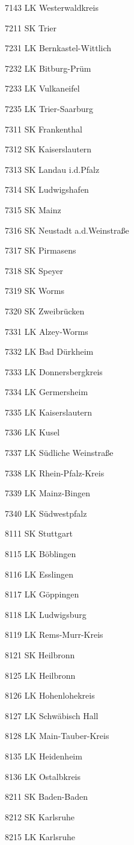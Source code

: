 7143  LK Westerwaldkreis

7211  SK Trier

7231  LK Bernkastel-Wittlich

7232  LK Bitburg-Prüm

7233  LK Vulkaneifel

7235  LK Trier-Saarburg

7311  SK Frankenthal

7312  SK Kaiserslautern

7313  SK Landau i.d.Pfalz

7314  SK Ludwigshafen

7315  SK Mainz

7316  SK Neustadt a.d.Weinstraße

7317  SK Pirmasens

7318  SK Speyer

7319  SK Worms

7320  SK Zweibrücken

7331  LK Alzey-Worms

7332  LK Bad Dürkheim

7333  LK Donnersbergkreis

7334  LK Germersheim

7335  LK Kaiserslautern

7336  LK Kusel

7337  LK Südliche Weinstraße

7338  LK Rhein-Pfalz-Kreis

7339  LK Mainz-Bingen

7340  LK Südwestpfalz

8111  SK Stuttgart

8115  LK Böblingen

8116  LK Esslingen

8117  LK Göppingen

8118  LK Ludwigsburg

8119  LK Rems-Murr-Kreis

8121  SK Heilbronn

8125  LK Heilbronn

8126  LK Hohenlohekreis

8127  LK Schwäbisch Hall

8128  LK Main-Tauber-Kreis

8135  LK Heidenheim

8136  LK Ostalbkreis

8211  SK Baden-Baden

8212  SK Karlsruhe

8215  LK Karlsruhe

